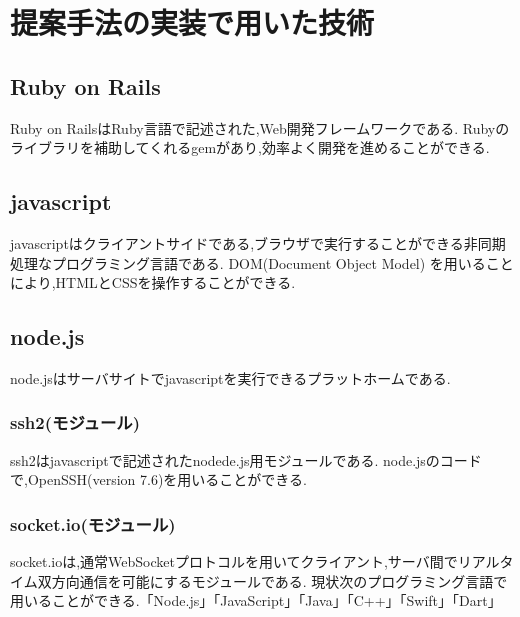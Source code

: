 \section{提案手法の実装で用いた技術}
    \subsection{Ruby on Rails\cite{Ruby on Rails}}
    Ruby on RailsはRuby言語で記述された,Web開発フレームワークである.
    Rubyのライブラリを補助してくれるgemがあり,効率よく開発を進めることができる.
    \subsection{javascript\cite{javascript}}
    javascriptはクライアントサイドである,ブラウザで実行することができる非同期処理なプログラミング言語である.
    DOM(Document Object Model) を用いることにより,HTMLとCSSを操作することができる.
    \subsection{node.js\cite{node.js}}
        node.jsはサーバサイトでjavascriptを実行できるプラットホームである.
        \subsubsection{ssh2(モジュール)\cite{ssh2-module}}%
            ssh2はjavascriptで記述されたnodede.js用モジュールである.
            node.jsのコードで,OpenSSH(version 7.6)を用いることができる.
        \subsubsection{socket.io(モジュール)\cite{socket.io}}%
            socket.ioは,通常WebSocketプロトコルを用いてクライアント,サーバ間でリアルタイム双方向通信を可能にするモジュールである.
            現状次のプログラミング言語で用いることができる.「Node.js」「JavaScript」「Java」「C++」「Swift」「Dart」 
